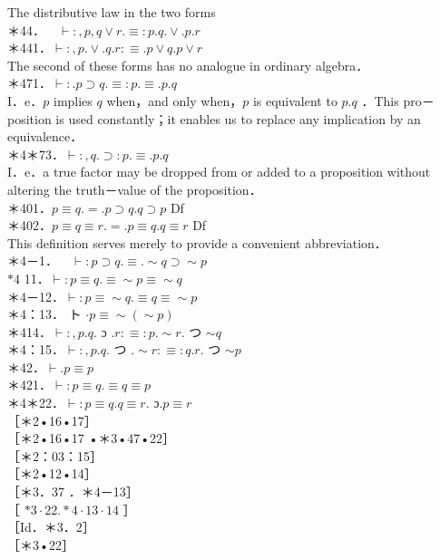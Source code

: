 \documentclass[10pt]{article}
\begin{document}
The distributive law in the two forms\\
＊44．$\quad \vdash:, p, q \vee r . \equiv: p . q . \vee . p . r$\\
＊441．$\vdash:, p . \vee . q . r: \equiv . p \vee q . p \vee r$\\
The second of these forms has no analogue in ordinary algebra．\\
＊471．$\vdash: . p \supset q . \equiv: p . \equiv . p . q$\\
I．e．$p$ implies $q$ when，and only when，$p$ is equivalent to $p . q$ ．This pro－ position is used constantly；it enables us to replace any implication by an equivalence．\\
＊4＊73．$\vdash:, q . \supset: p . \equiv . p . q$\\
I．e．a true factor may be dropped from or added to a proposition without altering the truth－value of the proposition．\\
＊401．$p \equiv q .=. p \supset q . q \supset p$ Df\\
＊402．$p \equiv q \equiv r .=. p \equiv q . q \equiv r$ Df\\
This definition serves merely to provide a convenient abbreviation．\\
＊4－1．$\quad \vdash: p \supset q . \equiv . \sim q \supset \sim p$\\
$* 4$ 11．$\vdash: p \equiv q . \equiv \sim p \equiv \sim q$\\
＊4－12．$\vdash: p \equiv \sim q . \equiv q \equiv \sim p$\\
＊4：13． ト $\cdot p \equiv \sim(\sim p)$\\
＊414．$\vdash:, p . q$. ɔ $. r: \equiv: p . \sim r$. つ $\sim q$\\
＊4：15．$\vdash:, p . q$. つ $. \sim r: \equiv: q . r$. つ $\sim p$\\
＊42．$\vdash . p \equiv p$\\
＊421．$\vdash: p \equiv q . \equiv q \equiv p$\\
＊4＊22．$\vdash: p \equiv q . q \equiv r$. ɔ.$p \equiv r$\\
［＊2•16•17］\\
［＊2•16•17 •＊3•47•22］\\
［＊2：03：15］\\
［＊2•12•14］\\
［＊3．37 ．＊4－13］\\
［ $* 3 \cdot 22 . * 4 \cdot 13 \cdot 14$ ］\\
［Id．＊3．2］\\
［＊3•22］
\end{document}
